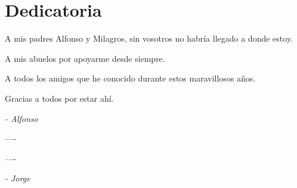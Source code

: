 
\chapter*{Dedicatoria}


\small

\hfill A mis padres Alfonso y Milagros, sin vosotros no habría llegado a donde estoy.

\hfill A mis abuelos por apoyarme desde siempre.

\hfill A todos los amigos que he conocido durante estos maravillosos años.

\hfill Gracias a todos por estar ahí.

\hfill \emph{- Alfonso}

\hfill 

\hfill ----

\hfill ----

\hfill \emph{- Jorge}


\thispagestyle{empty}\mbox{}